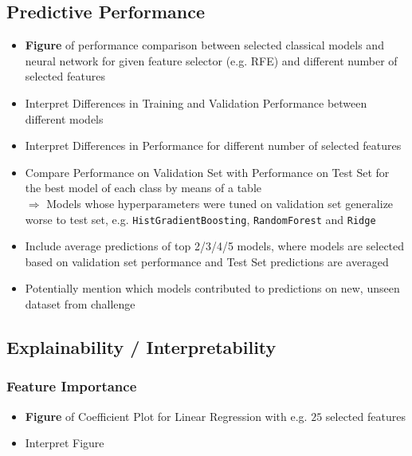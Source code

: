 \documentclass[12pt, letterpaper]{article}
\begin{document}
\subsection{Predictive Performance}
\begin{itemize}
    \item \textbf{Figure} of performance comparison between selected classical models and neural network for given feature selector (e.g. RFE) and different number of selected features
    \item Interpret Differences in Training and Validation Performance between different models
    \item Interpret Differences in Performance for different number of selected features
    \item Compare Performance on Validation Set with Performance on Test Set for the best model of each class by means of a table \\
          $\Rightarrow$ Models whose hyperparameters were tuned on validation set generalize worse to test set, e.g. \texttt{HistGradientBoosting}, \texttt{RandomForest} and \texttt{Ridge}
    \item Include average predictions of top 2/3/4/5 models, where models are selected based on validation set performance and Test Set predictions are averaged
    \item Potentially mention which models contributed to predictions on new, unseen dataset from challenge
\end{itemize}

\subsection{Explainability / Interpretability}

\subsubsection{Feature Importance}
\begin{itemize}
    \item \textbf{Figure} of Coefficient Plot for Linear Regression with e.g. $25$ selected features
    \item Interpret Figure
\end{itemize}
\end{document}
